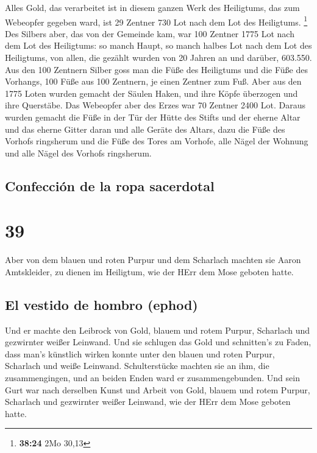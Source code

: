  Alles Gold, das verarbeitet ist in diesem ganzen Werk
des Heiligtums, das zum Webeopfer gegeben ward, ist 29 Zentner 730 Lot
nach dem Lot des Heiligtums. \footnote{\textbf{38:24} 2Mo 30,13}
 Des Silbers aber, das von der Gemeinde kam, war 100
Zentner 1775 Lot nach dem Lot des Heiligtums:  so manch
Haupt, so manch halbes Lot nach dem Lot des Heiligtums, von allen, die
gezählt wurden von 20 Jahren an und darüber, 603.550. 
Aus den 100 Zentnern Silber goss man die Füße des Heiligtums und die
Füße des Vorhangs, 100 Füße aus 100 Zentnern, je einen Zentner zum Fuß.
 Aber aus den 1775 Loten wurden gemacht der Säulen Haken,
und ihre Köpfe überzogen und ihre Querstäbe.  Das
Webeopfer aber des Erzes war 70 Zentner 2400 Lot.  Daraus
wurden gemacht die Füße in der Tür der Hütte des Stifts und der eherne
Altar und das eherne Gitter daran und alle Geräte des Altars,
 dazu die Füße des Vorhofs ringsherum und die Füße des
Tores am Vorhofe, alle Nägel der Wohnung und alle Nägel des Vorhofs
ringsherum.

\hypertarget{confecciuxf3n-de-la-ropa-sacerdotal}{%
\subsection{Confección de la ropa
sacerdotal}\label{confecciuxf3n-de-la-ropa-sacerdotal}}

\hypertarget{section-38}{%
\section{39}\label{section-38}}

 Aber von dem blauen und roten Purpur und dem Scharlach
machten sie Aaron Amtskleider, zu dienen im Heiligtum, wie der HErr dem
Mose geboten hatte.

\hypertarget{el-vestido-de-hombro-ephod-1}{%
\subsection{El vestido de hombro
(ephod)}\label{el-vestido-de-hombro-ephod-1}}

 Und er machte den Leibrock von Gold, blauem und rotem
Purpur, Scharlach und gezwirnter weißer Leinwand.  Und sie
schlugen das Gold und schnitten's zu Faden, dass man's künstlich wirken
konnte unter den blauen und roten Purpur, Scharlach und weiße Leinwand.
 Schulterstücke machten sie an ihm, die zusammengingen,
und an beiden Enden ward er zusammengebunden.  Und sein
Gurt war nach derselben Kunst und Arbeit von Gold, blauem und rotem
Purpur, Scharlach und gezwirnter weißer Leinwand, wie der HErr dem Mose
geboten hatte.

